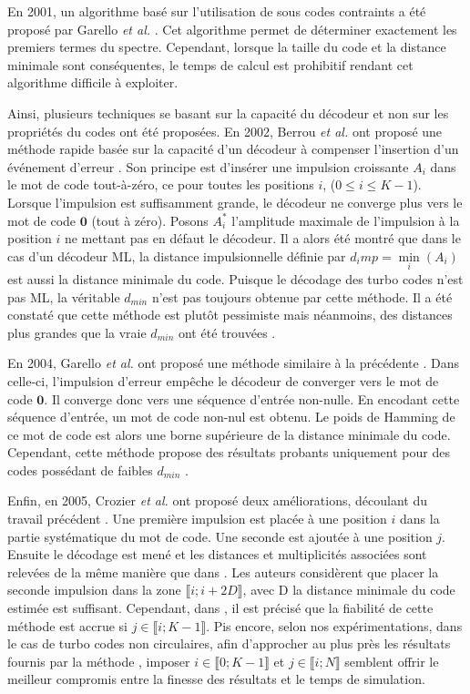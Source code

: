 En 2001, un algorithme basé sur l'utilisation de sous codes contraints a été proposé par Garello \textit{et al.} \cite{garellodfree}. 
Cet algorithme permet de déterminer exactement les premiers termes du spectre. Cependant, lorsque la taille du code et la 
distance minimale sont conséquentes, le temps de calcul est prohibitif rendant cet algorithme difficile à exploiter.
	
Ainsi, plusieurs techniques se basant sur la capacité du décodeur et non sur les propriétés du codes ont été proposées. En 2002, Berrou \textit{et al.} ont proposé une méthode rapide basée sur la capacité d'un 
décodeur à compenser l'insertion d'un événement d'erreur \cite{eim}. Son principe est d'insérer une impulsion croissante 
$A_i$ dans le mot de code tout-à-zéro, ce pour toutes les positions $i$, ($0\le i \le K-1$). Lorsque l'impulsion est 
suffisamment grande, le décodeur ne converge plus vers le mot de code $\mathbf{0}$ (tout à zéro). Posons $A_i^*$ l'amplitude 
maximale de l’impulsion à la position $i$ ne mettant pas en défaut le décodeur. Il a alors été montré que dans le cas 
d'un décodeur ML, la distance impulsionnelle définie par $d_imp = \min\limits_i (A_i)$ est aussi la distance minimale 
du code. Puisque le décodage des turbo codes n'est pas ML, la véritable $d_{min}$ n'est pas toujours obtenue par cette 
méthode. Il a été constaté que cette méthode est plutôt pessimiste mais néanmoins, des distances plus grandes que la 
vraie $d_{min}$ ont été trouvées \cite{yocComparisonMethods}.
	
En 2004, Garello \textit{et al.} ont proposé une méthode similaire à la précédente \cite{garelloAllZero}. Dans celle-ci, 
l'impulsion d'erreur empêche le décodeur de converger vers le mot de code $\mathbf{0}$. Il converge donc vers une séquence 
d'entrée non-nulle. En encodant cette séquence d'entrée, un mot de code non-nul est obtenu. Le poids de Hamming de ce mot 
de code est alors une borne supérieure de la distance minimale du code. Cependant, cette méthode propose des résultats 
probants uniquement pour des codes possédant de faibles $d_{min}$ \cite{yocComparisonMethods}.
	
Enfin, en 2005, Crozier \textit{et al.} ont proposé deux améliorations, découlant du travail précédent \cite{crozierDIM}. 
Une première impulsion est placée à une position $i$ dans la partie systématique du mot de code. Une seconde est ajoutée 
à une position $j$. Ensuite le décodage est mené et les distances et multiplicités associées sont relevées de la même 
manière que dans \cite{garelloAllZero}. Les auteurs considèrent que placer la seconde impulsion dans la zone $\llbracket i; i+2D\rrbracket$, 
avec D la distance minimale du code estimée est suffisant. Cependant, dans \cite{yocComparisonMethods}, il est précisé 
que la fiabilité de cette méthode est accrue si $j \in \llbracket i; K-1\rrbracket$. Pis encore, selon nos expérimentations, 
dans le cas de turbo codes non circulaires, afin d’approcher au plus près les résultats fournis par la méthode \cite{garellodfree}, 
imposer $i \in \llbracket 0; K-1\rrbracket$ et $j \in \llbracket i; N\rrbracket$ semblent offrir le meilleur compromis
entre la finesse des résultats et le temps de simulation.
	
